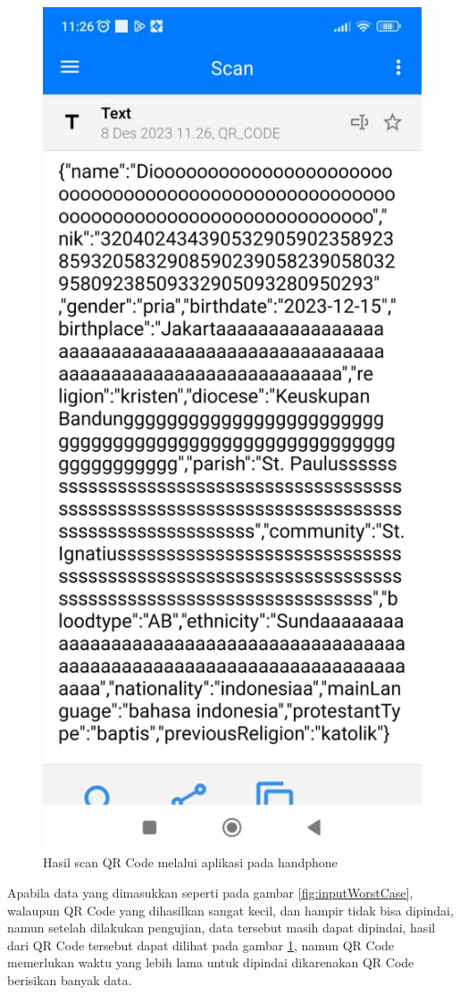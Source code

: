 \begin{figure}[H]
	\centering
	\includegraphics[scale=0.4]{Gambar/hasilScanWorst.jpg}
	\caption{Hasil scan QR Code melalui aplikasi pada handphone} 
	\label{fig:hasilScanWorst}
\end{figure}

Apabila data yang dimasukkan seperti pada gambar \ref{fig:inputWorstCase}, walaupun QR Code yang dihasilkan sangat kecil, dan hampir tidak bisa dipindai, namun setelah dilakukan pengujian, data tersebut masih dapat dipindai, hasil dari QR Code tersebut dapat dilihat pada gambar \ref{fig:hasilScanWorst}, namun QR Code memerlukan waktu yang lebih lama untuk dipindai dikarenakan QR Code berisikan banyak data.





